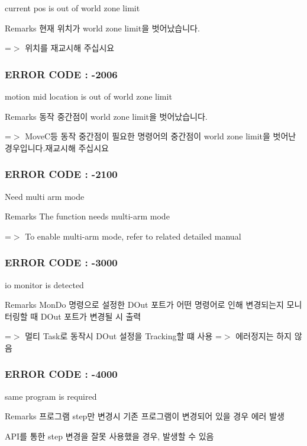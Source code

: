 current pos is out of world zone limit \begin{DoxyRemark}{Remarks}
현재 위치가 world zone limit을 벗어났습니다. \par
 =$>$ 위치를 재교시해 주십시요
\end{DoxyRemark}


 \subsubsection*{E\-R\-R\-O\-R C\-O\-D\-E \-: -\/2006 }

motion mid location is out of world zone limit \begin{DoxyRemark}{Remarks}
동작 중간점이 world zone limit을 벗어났습니다. \par
 =$>$ Move\-C등 동작 중간점이 필요한 명령어의 중간점이 world zone limit을 벗어난 경우입니다.\-재교시해 주십시요
\end{DoxyRemark}


 \subsubsection*{E\-R\-R\-O\-R C\-O\-D\-E \-: -\/2100 }

Need multi arm mode \begin{DoxyRemark}{Remarks}
The function needs multi-\/arm mode \par
 =$>$ To enable multi-\/arm mode, refer to related detailed manual
\end{DoxyRemark}


 \subsubsection*{E\-R\-R\-O\-R C\-O\-D\-E \-: -\/3000 }

io monitor is detected \begin{DoxyRemark}{Remarks}
Mon\-Do 명령으로 설정한 D\-Out 포트가 어떤 명령어로 인해 변경되는지 모니터링할 때 D\-Out 포트가 변경될 시 출력 \par
 =$>$ 멀티 Task로 동작시 D\-Out 설정을 Tracking할 떄 사용 =$>$ 에러정지는 하지 않음
\end{DoxyRemark}


 \subsubsection*{E\-R\-R\-O\-R C\-O\-D\-E \-: -\/4000 }

same program is required \begin{DoxyRemark}{Remarks}
프로그램 step만 변경시 기존 프로그램이 변경되어 있을 경우 에러 발생 \par
 A\-P\-I를 통한 step 변경을 잘못 사용했을 경우, 발생할 수 있음
\end{DoxyRemark}


